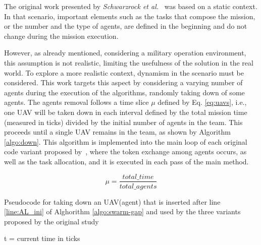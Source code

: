 
The original work presented by \textit{Schwarzrock et al.}~\citep{MAS07} was based on a static context. In that scenario, important elements such as the tasks that compose the mission, or the number and the type of agents, are defined in the beginning and do not change during the mission execution.

However, as already mentioned, considering a military operation environment, this assumption is not realistic, limiting the usefulness of the solution in the real world. To explore a more realistic context, dynamism in the scenario must be considered. This work targets this aspect by considering a varying number of agents during the execution of the algorithms, randomly taking down of some agents. 
The agents removal follows a time slice $\mu$ defined by Eq. \ref{eq:uavs}, i.e., one UAV will be taken down in each interval defined by the total mission time (measured in ticks) divided by the initial number of agents in the team. This proceeds until a single UAV remains in the team, as shown by Algorithm \ref{algo:down}. This algorithm is implemented into the main loop of each original code variant proposed by~\citep{MAS07}, where the token exchange among agents occurs, as well as the task allocation, and it is executed in each pass of the main method.

\begin{equation} \label{eq:uavs}
	\mu = \frac{total\_time}{total\_agents}
\end{equation}

\begin{algorithm}[!ht]
	\caption{Pseudocode for taking down an UAV(agent) that is inserted after line \ref{line:AL_ini} of Alghorithm \ref{algo:swarm-gap} and used by the three variants proposed by the original study \citep{MAS07}}
	\label{algo:down}
	
	\SetAlgoLined
	\DontPrintSemicolon
	\SetNlSkip{0.3em}
	
	t = current time in ticks \;
	
\end{algorithm}

